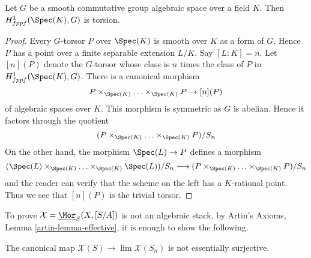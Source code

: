 \begin{lemma}
\label{lemma-torsors-over-field-torsion}
Let $G$ be a smooth commutative group algebraic space over a field $K$.
Then $H^1_{fppf}(\Spec(K), G)$ is torsion.
\end{lemma}

\begin{proof}
Every $G$-torsor $P$ over $\Spec(K)$ is smooth over $K$ as a form of $G$.
Hence $P$ has a point over a finite separable extension $L/K$.
Say $[L : K] = n$. Let $[n](P)$ denote the $G$-torsor whose class is $n$
times the class of $P$ in $H^1_{fppf}(\Spec(K), G)$. There is a canonical
morphism
$$
P \times_{\Spec(K)} \ldots \times_{\Spec(K)} P \to [n](P)
$$
of algebraic spaces over $K$. This morphism is symmetric as
$G$ is abelian. Hence it factors through the quotient
$$
(P \times_{\Spec(K)} \ldots \times_{\Spec(K)} P)/S_n
$$
On the other hand, the morphism $\Spec(L) \to P$ defines a morphism
$$
(\Spec(L) \times_{\Spec(K)} \ldots \times_{\Spec(K)} \Spec(L))/S_n
\longrightarrow (P \times_{\Spec(K)} \ldots \times_{\Spec(K)} P)/S_n
$$
and the reader can verify that the scheme on the left has a $K$-rational
point. Thus we see that $[n](P)$ is the trivial torsor.
\end{proof}

\noindent
To prove $\mathcal{X} = \underline{\Mor}_S(X, [S/A])$
is not an algebraic stack, by
Artin's Axioms, Lemma \ref{artin-lemma-effective},
it is enough to show the following.

\begin{lemma}
\label{lemma-not-essentially-surjective}
The canonical map $\mathcal{X}(S) \to \lim \mathcal{X}(S_n)$
is not essentially surjective.
\end{lemma}

